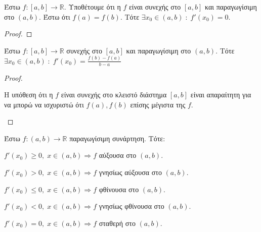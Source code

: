\documentclass[main.tex]{subfiles}
\begin{document}
            \begin{examples}
            \end{examples}

            \begin{thm}[Rolle]
                Έστω $ f \colon [a,b] \to \mathbb{R} $. Υποθέτουμε ότι η $ f $ είναι συνεχής 
                στο $ [a,b] $ και παραγωγίσιμη στο $ (a,b) $. Έστω ότι $ f(a)=f(b) $. Τότε
                $ \exists x_{0} \in (a,b) \; : \; f'(x_{0}) = 0 $.
            \end{thm}

            \begin{proof}

            \end{proof}

            \begin{thm}
                Έστω $ f \colon [a,b] \to \mathbb{R} $ συνεχής στο $ [a,b] $ και παραγωγίσιμη 
                στο $ (a,b) $. Τότε $ \exists x_{0} \in (a,b) \; : \; f'(x_{0}) = 
                \frac{f(b)-f(a)}{b-a} $
            \end{thm}

            \begin{proof}
                \begin{rem}
                    Η υπόθεση ότι η $f$ είναι συνεχής στο κλειστό διάστημα $ [a,b] $ είναι 
                    απαραίτητη για να μπορώ να ισχυριστώ ότι $ f(a), f(b) $ επίσης μέγιστα της $f$.
                \end{rem}   
            \end{proof}

            \begin{thm}
                Έστω $ f \colon (a,b) \to \mathbb{R} $ παραγωγίσιμη συνάρτηση. Τότε:
                \begin{myitemize}
                \item $ f'(x_{0}) \geq 0, \; x \in (a,b) \Rightarrow f $ αύξουσα στο $ (a,b) $.
                \item $ f'(x_{0}) > 0, \; x \in (a,b) \Rightarrow f $ γνησίως αύξουσα στο $ (a,b) $.
                \item $ f'(x_{0}) \leq 0, \; x \in (a,b) \Rightarrow f $ φθίνουσα στο $ (a,b) $.
                \item $ f'(x_{0}) < 0, \; x \in (a,b) \Rightarrow f$ γνησίως φθίνουσα στο $ (a,b) $.
                \item $ f'(x_{0}) = 0, \; x \in (a,b) \Rightarrow f $ σταθερή στο $ (a,b) $.
                \end{myitemize}
            \end{thm}




            
\end{document}
